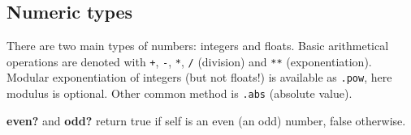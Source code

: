 \subsection{Numeric types}
There are two main types of numbers: integers and floats.
Basic arithmetical operations are denoted with \texttt{+}, \texttt{-}, \texttt{*}, \texttt{/} (division) and \texttt{**} (exponentiation).
Modular exponentiation of integers (but not floats!) is available as \texttt{.pow}, here modulus is optional.
Other common method is \texttt{.abs} (absolute value).

\textbf{even?} and \textbf{odd?} return true if self is an even (an odd) number, false otherwise.
